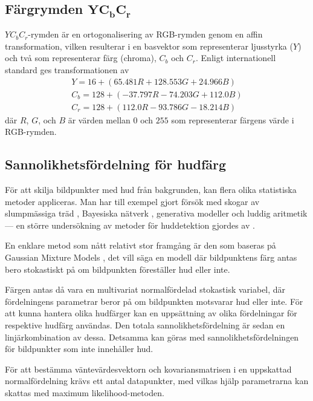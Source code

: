 \documentclass[../rapport_MVEX01-11-05]{subfiles}
\begin{document}
\subsection[Färgrymden $\mathrm{YC_bC_r}$]{Färgrymden $\mathbf{YC_bC_r}$}
$YC_bC_r$-rymden är en ortogonalisering av RGB-rymden genom en
affin transformation, vilken resulterar i en basvektor som
representerar ljusstyrka ($Y$) och två som representerar färg (chroma), $C_b$ och $C_r$. Enligt
internationell standard \cite{ITU-BT601} ges
transformationen av
\begin{equation*}
  \label{eq:farg:ycbcr}
  \begin{gathered}
  Y   = 16  + ( 65.481R + 128.553G + 24.966B)\\
  C_b = 128 + (-37.797R - 74.203G  + 112.0B )\\
  C_r = 128 + (112.0R   - 93.786G  - 18.214B)
  \end{gathered}
\end{equation*}
där $R$, $G$, och $B$ är värden mellan $0$ och $255$ som representerar
färgens värde i RGB-rymden.

\subsection{Sannolikhetsfördelning för hudfärg}\label{sec:klassificering:hud}

För att skilja bildpunkter med hud från bakgrunden,
kan flera olika statistiska metoder
appliceras. Man har till exempel gjort försök med skogar av
slumpmässiga träd
\cite{Khan10}, Bayesiska nätverk \cite{Sebe04}, generativa modeller
\cite{Kruppa02}
och luddig aritmetik \cite{Shang10} --- en större undersökning av metoder
för huddetektion gjordes av .

En enklare metod som nått relativt stor framgång är den som baseras på
Gaussian Mixture Models \cite{Elmezain08,Hassanpour08}, det vill säga
en modell där bildpunktens färg antas bero stokastiskt på om
bildpunkten föreställer hud eller inte.

Färgen antas då vara en multivariat normalfördelad
stokastisk variabel, där fördelningens parametrar beror på om
bildpunkten motsvarar hud eller inte. För att kunna hantera olika hudfärger kan en
uppsättning av olika
fördelningar för respektive hudfärg användas. Den totala
sannolikhetsfördelning är sedan en linjärkombination av dessa. Detsamma
kan göras med sannolikhetsfördelningen för bildpunkter som inte
innehåller hud.

För att bestämma väntevärdesvektorn och kovariansmatrisen i en
uppskattad normalfördelning krävs ett
antal datapunkter, med vilkas hjälp parametrarna kan skattas med maximum
likelihood-metoden.
\end{document}
